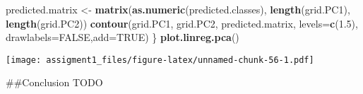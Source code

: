 \documentclass[
]{article}
\newenvironment{Shaded}{\begin{snugshade}}{\end{snugshade}}
\newcommand{\DataTypeTok}[1]{\textcolor[rgb]{0.13,0.29,0.53}{#1}}
\newcommand{\FloatTok}[1]{\textcolor[rgb]{0.00,0.00,0.81}{#1}}
\newcommand{\KeywordTok}[1]{\textcolor[rgb]{0.13,0.29,0.53}{\textbf{#1}}}
\newcommand{\NormalTok}[1]{#1}
\newcommand{\OtherTok}[1]{\textcolor[rgb]{0.56,0.35,0.01}{#1}}
\newcommand{\StringTok}[1]{\textcolor[rgb]{0.31,0.60,0.02}{#1}}
\begin{document}
\begin{Shaded}
\begin{Highlighting}[]
\NormalTok{  predicted.matrix <-}\StringTok{ }\KeywordTok{matrix}\NormalTok{(}\KeywordTok{as.numeric}\NormalTok{(predicted.classes), }\KeywordTok{length}\NormalTok{(grid.PC1), }\KeywordTok{length}\NormalTok{(grid.PC2))}
  \KeywordTok{contour}\NormalTok{(grid.PC1, grid.PC2, predicted.matrix, }\DataTypeTok{levels=}\KeywordTok{c}\NormalTok{(}\FloatTok{1.5}\NormalTok{), }\DataTypeTok{drawlabels=}\OtherTok{FALSE}\NormalTok{,}\DataTypeTok{add=}\OtherTok{TRUE}\NormalTok{)}
\NormalTok{\}}
\KeywordTok{plot.linreg.pca}\NormalTok{()}
\end{Highlighting}
\end{Shaded}

\texttt{[image: assigment1\_files/figure-latex/unnamed-chunk-56-1.pdf]}

\#\#Conclusion TODO
\end{document}
